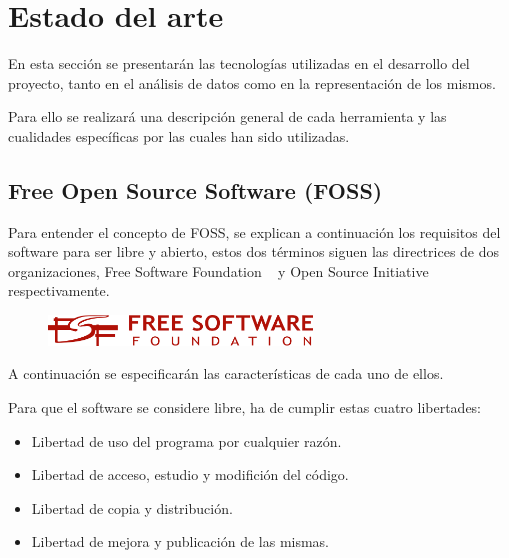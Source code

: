 \documentclass[a4paper, spanish, 12pt]{book}
\begin{document}

\cleardoublepage
\chapter{Estado del arte}

En esta secci\'on se presentar\'an las tecnolog\'ias utilizadas en el desarrollo
del proyecto, tanto en el an\'alisis de datos como en la representaci\'on de los
mismos.

Para ello se realizar\'a una descripci\'on general de cada herramienta y las
cualidades espec\'ificas por las cuales han sido utilizadas.

%

\section{Free Open Source Software (FOSS)}
\label{sec:FOSS}

Para entender el concepto de FOSS, se explican a continuaci\'on los requisitos
del software para ser libre y abierto, estos dos t\'erminos siguen las directrices
de dos organizaciones, Free Software Foundation ~\cite{fsf} y
Open Source Initiative ~\cite{opensource} respectivamente.

\begin{figure}[H]
  \centering
  \includegraphics[width=7cm, keepaspectratio]{img/fsf}
\end{figure}

A continuaci\'on se especificar\'an las caracter\'isticas de cada uno de ellos.

Para que el software se considere libre, ha de cumplir estas cuatro libertades:

\begin{itemize}

\item Libertad de uso del programa por cualquier raz\'on.

\item Libertad de acceso, estudio y modifici\'on del c\'odigo.

\item Libertad de copia y distribuci\'on.

\item Libertad de mejora y publicaci\'on de las mismas.

\end{itemize}
\end{document}
